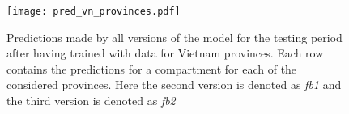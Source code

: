 \begin{figure}[!htb]
    \centering
    \texttt{[image: pred\_vn\_provinces.pdf]}
    \caption{Predictions made by all versions of the model for the testing period after having trained with data for Vietnam provinces. Each row contains the predictions for a compartment for each of the considered provinces. Here the second version is denoted as \textit{fb1} and the third version is denoted as \textit{fb2}}
    \label{fig:pred-vn-provinces}
\end{figure}

